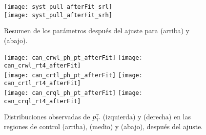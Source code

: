 \begin{figure}[!htb]
  \centering

  \texttt{[image: syst\_pull\_afterFit\_srl]} \\
  \texttt{[image: syst\_pull\_afterFit\_srh]}

  \caption{Resumen de los parámetros después del ajuste para {\SRL} (arriba) y {\SRH} (abajo).}
  \label{fig:fit_unc_nuisance}

\end{figure}







\begin{figure}[!htb]
  \centering

  \texttt{[image: can\_crwl\_ph\_pt\_afterFit]}
  \texttt{[image: can\_crwl\_rt4\_afterFit]} \\

  \texttt{[image: can\_crtl\_ph\_pt\_afterFit]}
  \texttt{[image: can\_crtl\_rt4\_afterFit]} \\

  \texttt{[image: can\_crql\_ph\_pt\_afterFit]}
  \texttt{[image: can\_crql\_rt4\_afterFit]} \\

   \caption{Distribuciones observadas de $p_{\mathrm{T}}^\gamma$ (izquierda) y {\rt} (derecha) en las
     regiones de control {\CRWL} (arriba), {\CRTL} (medio) y {\CRQL} (abajo),
     después del ajuste.}
   \label{fig:bkgfit_crl_after}

\end{figure}


